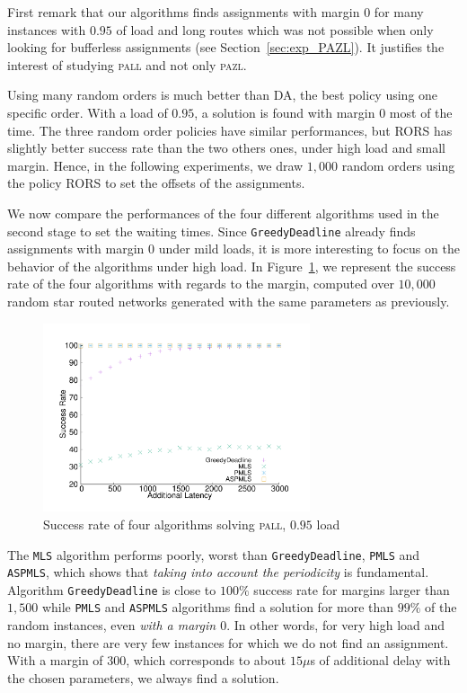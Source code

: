 \documentclass[a4paper,10pt]{journal}
\newcommand\greedydeadline{\texttt{GreedyDeadline}\xspace}
\newcommand\MLS{\texttt{MLS}\xspace}
\newcommand\PMLS{\texttt{PMLS}\xspace}
\newcommand\ASPMLS{\texttt{ASPMLS}\xspace}
\newcommand\pazl{\textsc{pazl}\xspace}
\newcommand\pall{\textsc{pall}\xspace}
\begin{document}
 First remark that our algorithms finds assignments with margin $0$ for many instances with $0.95$ of load and long routes which was not possible when only looking for bufferless assignments (see Section~\ref{sec:exp_PAZL}). It justifies the interest of studying \pall and not only \pazl.
  
     Using many random orders is much better than DA, the best policy using one specific order. 
     With a load of $0.95$, a solution is found with margin $0$ most of the time. The three random order policies have similar performances, but RORS has slightly better success rate than the two others ones, under high load and small margin. Hence, in the following experiments, we draw $1,000$ random orders using the policy RORS to set the offsets of the assignments.
     
     We now compare the performances of the four different algorithms used in the second stage to set the waiting times. Since \greedydeadline already finds assignments with margin $0$ under mild loads, it is more interesting to focus on the behavior of the algorithms under high load. In Figure~\ref{fig:success21000}, we represent the success rate of the four algorithms with regards to the margin, computed over $10,000$ random star routed networks generated with the same parameters as previously. 
     
    \begin{figure} [h] 
       \begin{center}
      \includegraphics[width=0.7\textwidth]{retour_21000.pdf}
      \end{center}
      \caption{Success rate of four algorithms solving \pall, $0.95$ load}
     \label{fig:success21000}
     \end{figure}
     
      The \MLS algorithm performs poorly, worst than \greedydeadline, \PMLS and \ASPMLS, which shows that \emph{taking into account the periodicity} is fundamental.
     Algorithm \greedydeadline is close to $100\%$ success rate for margins larger than $1,500$ while  \PMLS and \ASPMLS algorithms find a solution for more than $99\%$ of the random instances, even \emph{with a margin $0$}. In other words, for very high load and no margin, there are very few instances for which we do not find an assignment. With a margin of $300$, which corresponds to about $15\mu$s of additional delay with the chosen parameters, we always find a solution. 
     
\end{document}
